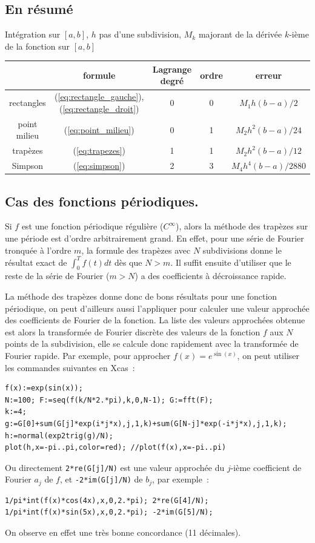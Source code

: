 \documentclass[a4paper,11pt]{article}
\begin{document}
\subsection{En r\'esum\'e}
Int\'egration sur $[a,b]$, $h$ pas d'une subdivision, $M_k$ majorant
de la d\'eriv\'ee $k$-i\`eme de la fonction sur $[a,b]$\\
\begin{tabular}{|c|c|c|c|c|} \hline 
 & formule & Lagrange degr\'e & ordre & erreur \\ \hline
rectangles & (\ref{eq:rectangle_gauche}), (\ref{eq:rectangle_droit}) & 0 & 0 & $M_1 h (b-a)/2$ \\
point milieu & (\ref{eq:point_milieu}) & 0 & 1 & $M_2 h^2 (b-a)/24$ \\
trap\`ezes & (\ref{eq:trapezes}) & 1 & 1 & $M_2 h^2 (b-a)/12$ \\
Simpson & (\ref{eq:simpson})& 2 & 3 & $M_4 h^4 (b-a)/2880$  \\ \hline
\end{tabular}

\subsection{Cas des fonctions p\'eriodiques.}
Si $f$ est une fonction p\'eriodique r\'eguli\`ere ($C^\infty$),
alors la m\'ethode des trap\`ezes sur une p\'eriode est d'ordre 
arbitrairement grand. En effet, pour une s\'erie de Fourier tronqu\'ee
\`a l'ordre $m$, la formule des trap\`ezes avec $N$ subdivisions donne
le r\'esultat exact de $\int_0^T f(t) dt$ d\`es que $N>m$. Il suffit
ensuite d'utiliser que le reste de
la s\'erie de Fourier ($m>N$) 
a des coefficients \`a d\'ecroissance rapide.

La m\'ethode des trap\`ezes donne donc de bons r\'esultats pour une 
fonction p\'eriodique, on peut d'ailleurs aussi 
l'appliquer pour calculer une valeur
approch\'ee des coefficients de Fourier de la fonction. La liste des valeurs
approch\'ees obtenue est alors la transform\'ee de Fourier discr\`ete
des valeurs de la fonction $f$ aux $N$ points de la subdivision, elle
se calcule donc rapidement avec la transform\'ee de Fourier rapide.
Par exemple, pour approcher $f(x)=e^{\sin(x)}$, on peut utiliser les
commandes suivantes en Xcas~:
\begin{verbatim}
f(x):=exp(sin(x));
N:=100; F:=seq(f(k/N*2.*pi),k,0,N-1); G:=fft(F);
k:=4;
g:=G[0]+sum(G[j]*exp(i*j*x),j,1,k)+sum(G[N-j]*exp(-i*j*x),j,1,k);
h:=normal(exp2trig(g)/N);
plot(h,x=-pi..pi,color=red); //plot(f(x),x=-pi..pi)
\end{verbatim}
Ou directement \verb|2*re(G[j]/N)| est une valeur approch\'ee du
$j$-i\`eme coefficient de Fourier $a_j$ de $f$, et \verb|-2*im(G[j]/N)|
de $b_j$, par exemple~:
\begin{verbatim}
1/pi*int(f(x)*cos(4x),x,0,2.*pi); 2*re(G[4]/N);
1/pi*int(f(x)*sin(5x),x,0,2.*pi); -2*im(G[5]/N);
\end{verbatim}
On observe en effet une tr\`es bonne concordance (11 d\'ecimales).
\end{document}
